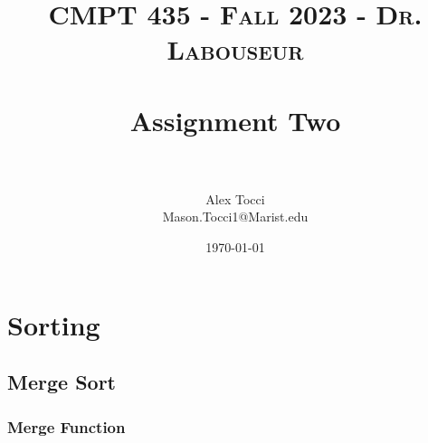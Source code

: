 \documentclass[letterpaper, 10pt,DIV=13]{scrartcl}
\title{	
   \normalfont \normalsize 
   \textsc{CMPT 435 - Fall 2023 - Dr. Labouseur} \\[10pt] %
   \horrule{0.5pt} \\[0.25cm] 	%
   \huge Assignment Two  \\     	    %
   \horrule{0.5pt} \\[0.25cm] 	%
}
\author{Alex Tocci \\ \normalsize Mason.Tocci1@Marist.edu}
\date{\normalsize\today} 	%
\numberwithin{equation}{section} %
\numberwithin{figure}{section} %
\numberwithin{table}{section} %
\begin{document}
\maketitle %

\section{Sorting}
\subsection{Merge Sort}
\subsubsection{Merge Function}
\end{document}
